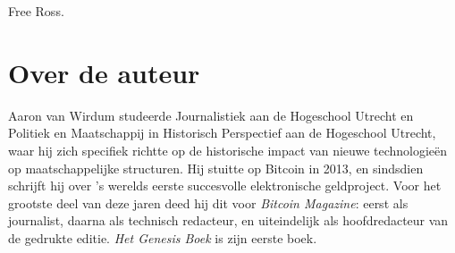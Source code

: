 \documentclass[
  a5paper,
  smalldemyvopaper,11pt,twoside,onecolumn,openright,extrafontsizes]{memoir}
\begin{document}
Free Ross.


\chapter*{Over de auteur}\label{over-de-auteur}


Aaron van Wirdum studeerde Journalistiek aan de Hogeschool Utrecht en
Politiek en Maatschappij in Historisch Perspectief aan de Hogeschool
Utrecht, waar hij zich specifiek richtte op de historische impact van
nieuwe technologieën op maatschappelijke structuren. Hij stuitte op
Bitcoin in 2013, en sindsdien schrijft hij over 's werelds eerste
succesvolle elektronische geldproject. Voor het grootste deel van deze
jaren deed hij dit voor \emph{Bitcoin Magazine}: eerst als journalist,
daarna als technisch redacteur, en uiteindelijk als hoofdredacteur van
de gedrukte editie. \emph{Het Genesis Boek} is zijn eerste boek.


\backmatter
\end{document}
